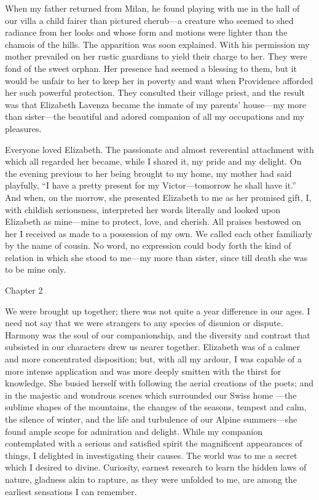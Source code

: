 \documentclass[12pt,openright]{book}
\begin{document}
When my father returned from Milan, he found playing with me in the hall of our villa a child fairer than pictured cherub—a creature who seemed to shed radiance from her looks and whose form and motions were lighter than the chamois of the hills. The apparition was soon explained. With his permission my mother prevailed on her rustic guardians to yield their charge to her. They were fond of the sweet orphan. Her presence had seemed a blessing to them, but it would be unfair to her to keep her in poverty and want when Providence afforded her such powerful protection. They consulted their village priest, and the result was that Elizabeth Lavenza became the inmate of my parents’ house—my more than sister—the beautiful and adored companion of all my occupations and my pleasures.

Everyone loved Elizabeth. The passionate and almost reverential attachment with which all regarded her became, while I shared it, my pride and my delight. On the evening previous to her being brought to my home, my mother had said playfully, “I have a pretty present for my Victor—tomorrow he shall have it.” And when, on the morrow, she presented Elizabeth to me as her promised gift, I, with childish seriousness, interpreted her words literally and looked upon Elizabeth as mine—mine to protect, love, and cherish. All praises bestowed on her I received as made to a possession of my own. We called each other familiarly by the name of cousin. No word, no expression could body forth the kind of relation in which she stood to me—my more than sister, since till death she was to be mine only.

Chapter 2

We were brought up together; there was not quite a year difference in our ages. I need not say that we were strangers to any species of disunion or dispute. Harmony was the soul of our companionship, and the diversity and contrast that subsisted in our characters drew us nearer together. Elizabeth was of a calmer and more concentrated disposition; but, with all my ardour, I was capable of a more intense application and was more deeply smitten with the thirst for knowledge. She busied herself with following the aerial creations of the poets; and in the majestic and wondrous scenes which surrounded our Swiss home —the sublime shapes of the mountains, the changes of the seasons, tempest and calm, the silence of winter, and the life and turbulence of our Alpine summers—she found ample scope for admiration and delight. While my companion contemplated with a serious and satisfied spirit the magnificent appearances of things, I delighted in investigating their causes. The world was to me a secret which I desired to divine. Curiosity, earnest research to learn the hidden laws of nature, gladness akin to rapture, as they were unfolded to me, are among the earliest sensations I can remember.
\end{document}

